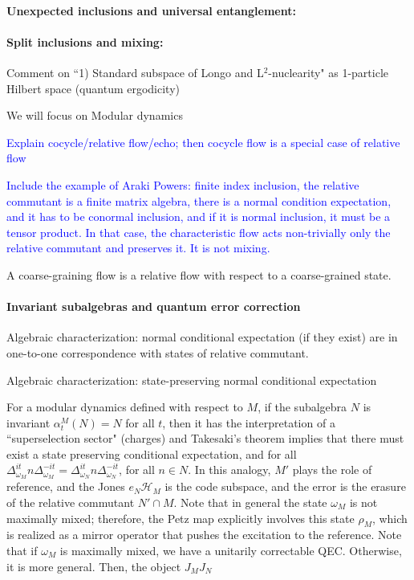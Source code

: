 \documentclass[a4paper,11pt]{article}
\theoremstyle{definition}
\newcommand{\NL}[1]{\textcolor{blue}{#1}}
\begin{document}
\paragraph{Unexpected inclusions and universal entanglement:}


\paragraph{Split inclusions and mixing:}


Comment on ``1) Standard subspace of Longo and L$^2$-nuclearity" as 1-particle Hilbert space (quantum ergodicity)

We will focus on Modular dynamics

\NL{Explain cocycle/relative flow/echo; then cocycle flow is a special case of relative flow}

\NL{Include the example of Araki Powers: finite index inclusion, the relative commutant is a finite matrix algebra, there is a normal condition expectation, and it has to be conormal inclusion, and if it is normal inclusion, it must be a tensor product. In that case, the characteristic flow acts non-trivially only the relative commutant and preserves it. It is not mixing.}



A coarse-graining flow is a relative flow with respect to a coarse-grained state.

\paragraph{Invariant subalgebras and quantum error correction}

Algebraic characterization: normal conditional expectation (if they exist) are in one-to-one correspondence with states of relative commutant.

Algebraic characterization: state-preserving normal conditional expectation



For a modular dynamics defined with respect to $M$, if the subalgebra $N$ is invariant $\alpha_t^M(N)=N$ for all $t$, then it has the interpretation of a ``superselection sector" (charges) and Takesaki's theorem implies that there must exist a state preserving conditional expectation, and for all $\Delta_{\omega_M}^{it} n\Delta_{\omega_M}^{-it}=\Delta_{\omega_N}^{it}n\Delta_{\omega_N}^{-it}$, for all $n\in N$. In this analogy, $M'$ plays the role of reference, and the Jones $e_N\mathcal{H}_M$ is the code subspace, and the error is the erasure of the relative commutant $N'\cap M$. Note that in general the state $\omega_M$ is not maximally mixed; therefore, the Petz map explicitly involves this state $\rho_M$, which is realized as a mirror operator that pushes the excitation to the reference. Note that if $\omega_M$ is maximally mixed, we have a unitarily correctable QEC. Otherwise, it is more general. Then, the object $J_M J_N$
\end{document}
